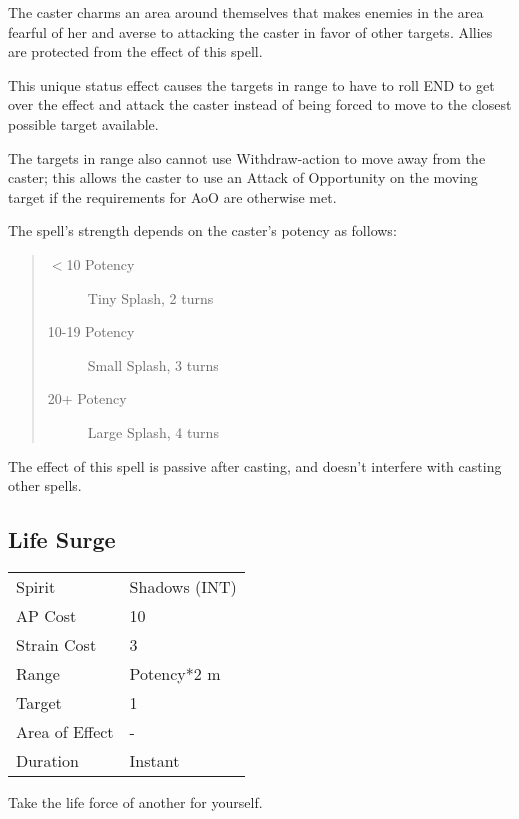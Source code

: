 \documentclass[11pt,a4paper,twocolumn]{book}
\begin{document}
\medskip

The caster charms an area around themselves that makes enemies in the area fearful of her and averse to attacking the caster in favor of other targets. Allies are protected from the effect of this spell.

This unique status effect causes the targets in range to have to roll END to get over the effect and attack the caster instead of being forced to move to the closest possible target available. 

The targets in range also cannot use Withdraw-action to move away from the caster; this allows the caster to use an Attack of Opportunity on the moving target if the requirements for AoO are otherwise met.


\newpage
The spell's strength depends on the caster's potency as follows: 
\begin{quote}
	\begin{description}
		\item[$<$10 Potency] 	Tiny Splash, 2 turns
		\item[10-19 Potency] 	Small Splash, 3 turns
		\item[20+ Potency]  	Large Splash, 4 turns
	\end{description}	
\end{quote}
\medskip

The effect of this spell is passive after casting, and doesn't interfere with casting other spells.

\subsection*{Life Surge}
{
	\begin{tabu} to 75mm{| X[l,4] | X[l,7] |}
		\hline
		Spirit 			& Shadows (INT) 		\\
		AP Cost	      	& 10 					\\
		Strain Cost     & 3 					\\
		Range     		& Potency*2 m			\\
		Target      	& 1						\\
		Area of Effect  & -  	 				\\
		Duration     	& Instant				\\ \hline
	\end{tabu}
	
}

\medskip

Take the life force of another for yourself.
\end{document}

